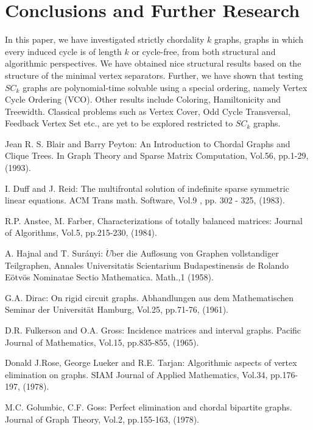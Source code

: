 \documentclass[runningheads]{llncs}
\begin{document}
\section{Conclusions and Further Research}
In this paper, we have investigated strictly chordality $k$ graphs, graphs in which every induced cycle is of length $k$ or cycle-free, from both structural and algorithmic perspectives. We have obtained nice structural results based on the structure of the minimal vertex separators. Further, we have shown that testing $SC_k$ graphs are polynomial-time solvable using a special ordering, namely Vertex Cycle Ordering (VCO). Other results include Coloring, Hamiltonicity and Treewidth. Classical problems such as Vertex Cover, Odd Cycle Transversal, Feedback Vertex Set etc., are yet to be explored restricted to $SC_k$ graphs. 
\nocite{*}
\begin{thebibliography}{}

Jean R. S. Blair and Barry Peyton: An Introduction to Chordal Graphs and Clique Trees. In Graph Theory and Sparse Matrix Computation, Vol.56, pp.1-29, (1993).

I. Duff and J. Reid: The multifrontal solution of indefinite sparse symmetric linear equations. ACM Trans math. Software, Vol.9 , pp. 302 - 325, (1983).

R.P. Anstee, M. Farber, Characterizations of totally balanced matrices: Journal of Algorithms, Vol.5, pp.215-230, (1984).

A. Hajnal and T. Surányi: $\ddot{U}$ber die Aufl$\ddot{o}$sung von Graphen vollstandiger Teilgraphen, Annales Universitatis Scientarium Budapestinensis de Rolando Eötvös Nominatae
Sectio Mathematica. Math.,1 (1958).


G.A. Dirac: On rigid circuit graphs. Abhandlungen aus dem Mathematischen Seminar der Universität Hamburg, Vol.25, pp.71-76, (1961).

D.R. Fulkerson and O.A. Gross: Incidence matrices and interval graphs. Pacific Journal of Mathematics, Vol.15, pp.835-855, (1965).

Donald J.Rose,  George Lueker and R.E. Tarjan: Algorithmic aspects of vertex elimination on graphs. SIAM Journal of Applied Mathematics, Vol.34, pp.176-197, (1978).

M.C. Golumbic, C.F. Goss: Perfect elimination and chordal bipartite graphs. Journal of Graph Theory, Vol.2, pp.155-163, (1978).


\end{thebibliography}
\end{document}

